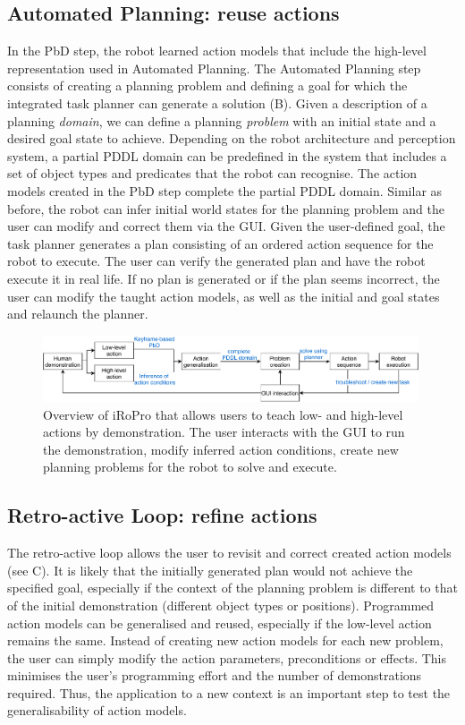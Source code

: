 \subsection{Automated Planning: reuse actions}\label{sec:AP}
In the PbD step, the robot learned action models that include the high-level representation used in Automated Planning. 
The Automated Planning step consists of creating a planning problem and defining a goal for which the integrated task planner can generate a solution (B).
Given a description of a planning \textit{domain}, we can define a planning \textit{problem} with an initial state and a desired goal state to achieve. 
Depending on the robot architecture and perception system, a partial PDDL domain can be predefined in the system that includes a set of object types and predicates that the robot can recognise.
The action models created in the PbD step complete the partial PDDL domain.
Similar as before, the robot can infer initial world states for the planning problem and the user can modify and correct them via the GUI.
Given the user-defined goal, the task planner generates a plan consisting of an ordered action sequence for the robot to execute. 
The user can verify the generated plan and have the robot execute it in real life.
If no plan is generated or if the plan seems incorrect, the user can modify the taught action models, as well as the initial and goal states and relaunch the planner.


\begin{figure}
	\centering
	\includegraphics[width=0.99\textwidth]{Fig6.pdf}
	\caption{Overview of iRoPro that allows users to teach low- and high-level actions by demonstration. The user interacts with the GUI to run the demonstration, modify inferred action conditions, create new planning problems for the robot to solve and execute.}
	\label{fig:overview}
\end{figure}
\subsection{Retro-active Loop: refine actions}
The retro-active loop allows the user to revisit and correct created action models (see C).
It is likely that the initially generated plan would not achieve the specified goal, especially if the context of the planning problem is different to that of the initial demonstration (\eg different object types or positions).
Programmed action models can be generalised and reused, especially if the low-level action remains the same.
Instead of creating new action models for each new problem, the user can simply modify the action parameters, preconditions or effects.
This minimises the user's programming effort and the number of demonstrations required.
Thus, the application to a new context is an important step to test the generalisability of action models.

